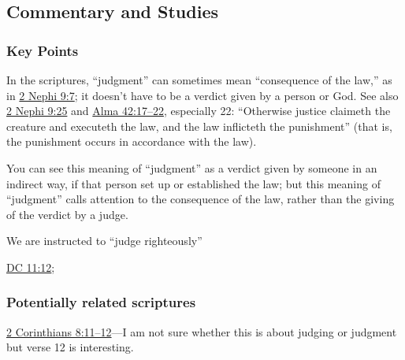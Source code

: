 	
	
	
\subsection{Commentary and Studies} %
	\label{JUDGE-COMMENTARY}

	\subsubsection{Key Points}
		\label{JUDGE-KEYS}
	
		\begin{compactitem}
			\item In the scriptures, ``judgment'' can sometimes mean ``consequence of the law,'' as in \hyperref[2NEPHI-9-7]{2 Nephi 9:7}; it doesn't have to be a verdict given by a person or God. See also \hyperref[2NEPHI-9-25]{2 Nephi 9:25} and \hyperref[ALMA-42-17]{Alma 42:17--22}, especially 22: ``Otherwise justice claimeth the creature and executeth the law, and the law inflicteth the punishment'' (that is, the punishment occurs in accordance with the law).
				\begin{compactitem}
					\item You can see this meaning of ``judgment'' as a verdict given by someone in an indirect way, if that person set up or established the law; but this meaning of ``judgment'' calls attention to the consequence of the law, rather than the giving of the verdict by a judge.
				\end{compactitem}
			\item We are instructed to ``judge righteously''
				\begin{compactitem}
					\item \hyperref[DC11-12]{DC 11:12}; 
				\end{compactitem}
		\end{compactitem}
		
	\subsubsection{Potentially related scriptures}
		\label{JUDGE-scriptures}
		
		\begin{compactitem}
			\item \hyperref[2CORINTHIANS-8-11]{2 Corinthians 8:11--12}---I am not sure whether this is about judging or judgment but verse 12 is interesting.
		\end{compactitem}